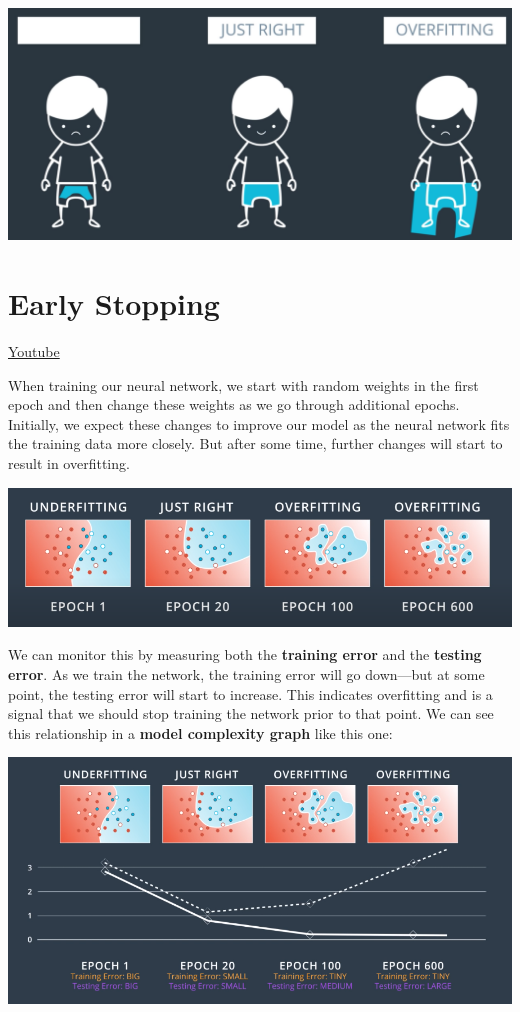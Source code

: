 \includegraphics[width=0.75\linewidth]{img//intro//trainingNN/image.png}

\section{Early Stopping}
\href{https://www.youtube.com/watch?v=NnS0FJyVcDQ&t=2s&ab_channel=Udacity}{Youtube} \newline

When training our neural network, we start with random weights in the first epoch and then change these weights as we go through additional epochs. Initially, we expect these changes to improve our model as the neural network fits the training data more closely. But after some time, further changes will start to result in overfitting.

\includegraphics[width=1\linewidth]{img//intro//trainingNN/training-considerations-4.png}

We can monitor this by measuring both the \textbf{training error} and the \textbf{testing error}. As we train the network, the training error will go down—but at some point, the testing error will start to increase. This indicates overfitting and is a signal that we should stop training the network prior to that point. We can see this relationship in a \textbf{model complexity graph} like this one:

\includegraphics[width=1\linewidth]{img//intro//trainingNN/training-considerations-5.png}

